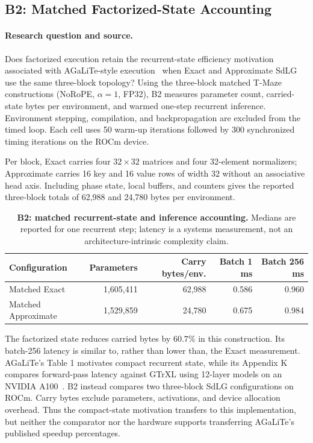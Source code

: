 \subsection{B2: Matched Factorized-State Accounting}
\paragraph{Research question and source.}
Does factorized execution retain the recurrent-state efficiency motivation associated with AGaLiTe-style execution~\cite{pramanik2024agalite} when Exact and Approximate SdLG use the same three-block topology?
Using the three-block matched T-Maze constructions (NoRoPE, $\alpha=1$, FP32), B2 measures parameter count, carried-state bytes per environment, and warmed one-step recurrent inference. Environment stepping, compilation, and backpropagation are excluded from the timed loop. Each cell uses 50 warm-up iterations followed by 300 synchronized timing iterations on the ROCm device.

Per block, Exact carries four $32\times32$ matrices and four 32-element normalizers; Approximate carries 16 key and 16 value rows of width 32 without an associative head axis. Including phase state, local buffers, and counters gives the reported three-block totals of 62,988 and 24,780 bytes per environment.

\begin{table}[ht]
\centering\small
\caption{\textbf{B2: matched recurrent-state and inference accounting.} Medians are reported for one recurrent step; latency is a systems measurement, not an architecture-intrinsic complexity claim.}
\label{tab:matched_inference_transfer}
\begin{tabular}{lrrrr}
\toprule
Configuration & Parameters & Carry bytes/env. & Batch 1 ms & Batch 256 ms \\
\midrule
Matched Exact & 1,605,411 & 62,988 & 0.586 & 0.960 \\
Matched Approximate & 1,529,859 & 24,780 & 0.675 & 0.984 \\
\bottomrule
\end{tabular}
\end{table}

The factorized state reduces carried bytes by $60.7\%$ in this construction. Its batch-256 latency is similar to, rather than lower than, the Exact measurement. AGaLiTe's Table 1 motivates compact recurrent state, while its Appendix K compares forward-pass latency against GTrXL using 12-layer models on an NVIDIA A100~\cite{pramanik2024agalite}. B2 instead compares two three-block SdLG configurations on ROCm. Carry bytes exclude parameters, activations, and device allocation overhead. Thus the compact-state motivation transfers to this implementation, but neither the comparator nor the hardware supports transferring AGaLiTe's published speedup percentages.

